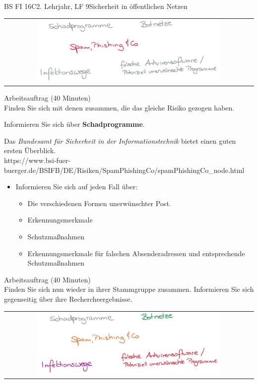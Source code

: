 \documentclass[oneside,openany,headings=optiontotoc,11pt,numbers=noenddot]{scrreprt}
\begin{document}
\begin{worksheet}{BS FI 16C}{2. Lehrjahr, LF 9}{Sicherheit in öffentlichen Netzen}
		\newpage
		\setcounter{page}{1}
		\begin{framed}
			\begin{tabular}{lcr}
				& \includegraphics[width=0.8\textwidth]{Bilder/SpamPhishing.jpg} & \\
			\end{tabular}
		\end{framed}
		\color{codegray}Arbeitsauftrag (40 Minuten)\\
		\color{black}
		Finden Sie sich mit denen zusammen, die das gleiche Risiko gezogen haben.
		\par
		\bigskip
		\noindent
		Informieren Sie sich über \textbf{Schadprogramme}.
		\par\bigskip\noindent
		Das \textit{Bundesamt für Sicherheit in der Informationstechnik} bietet einen guten ersten Überblick.\\
		\small{\color{codegray}https://www.bsi-fuer-buerger.de/BSIFB/DE/Risiken/SpamPhishingCo/spamPhishingCo\_node.html}
		\normalsize
		\begin{itemize}
			\item[] Informieren Sie sich auf jeden Fall über:
			\begin{itemize}
				\item Die verschiedenen Formen unerwünschter Post.
				\item Erkennungsmerkmale
				\item Schutzmaßnahmen
				\item Erkennungsmerkmale für falschen Absenderadressen und entsprechende Schutzmaßnahmen
			\end{itemize}
		\end{itemize}
		\par
		\bigskip
		\noindent
		
		\color{codegray}Arbeitsauftrag (40 Minuten)\\
		\color{black}
		Finden Sie sich nun wieder in ihrer Stammgruppe zusammen. Informieren Sie sich gegenseitig über ihre Rechercheergebnisse.

		\newpage
		\setcounter{page}{1}
		\noindent
		\begin{framed}
			\begin{tabular}{lcr}
				& \includegraphics[width=0.8\textwidth]{Bilder/Gefahren.jpg} &
			\end{tabular}
		\end{framed}
		

\end{worksheet}
\end{document}
